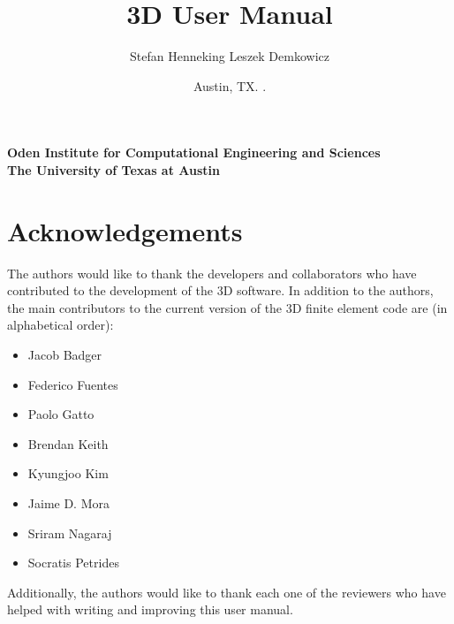\documentclass[11pt]{report}
\begin{document}
\baselineskip=16pt
\parskip=4pt

\begin{titlepage}

\title
{
\Huge
\hp3D User Manual
}

\author
{
\LARGE
Stefan Henneking
\hskip 40pt
Leszek Demkowicz
}

\affil
{
\large \bf
Oden Institute for Computational Engineering and Sciences\\
\large \bf
The University of Texas at Austin
}

\date
{
\large
Austin, TX. \the\year{}.
}

\maketitle

\end{titlepage}

\clearpage
{}
\setcounter{page}{2} 

\chapter*{Acknowledgements}

The authors would like to thank the developers and collaborators who have contributed to the development of the \hp3D software. In addition to the authors, the main contributors to the current version of the \hp3D finite element code are (in alphabetical order):

\begin{itemize}
	\itemsep 0pt
	\item Jacob Badger
	\item Federico Fuentes
	\item Paolo Gatto
	\item Brendan Keith
	\item Kyungjoo Kim
	\item Jaime D. Mora
	\item Sriram Nagaraj
	\item Socratis Petrides
\end{itemize}

Additionally, the authors would like to thank each one of the reviewers who have helped with writing and improving this user manual.

\clearpage
\tableofcontents
\end{document}
